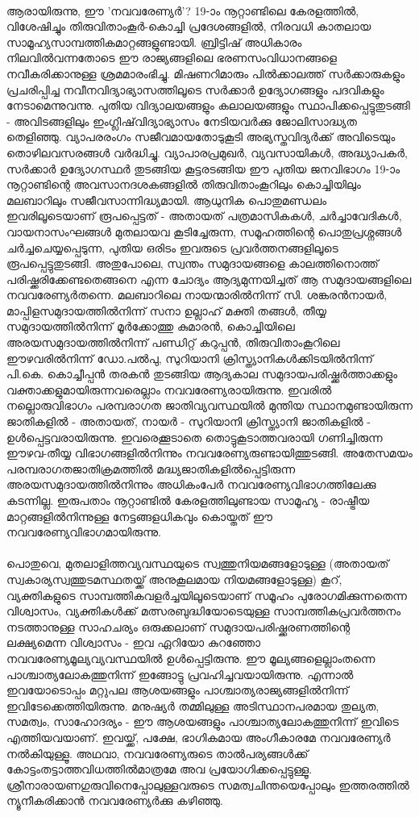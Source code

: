 \paragraph{}ആരായിരുന്നു, ഈ 'നവവരേണ്യർ'? 19-ാം നൂറ്റാണ്ടിലെ കേരളത്തിൽ, വിശേഷിച്ചും തിരുവിതാംകൂർ-കൊച്ചി പ്രദേശങ്ങളിൽ, നിരവധി കാതലായ സാമൂഹ്യസാമ്പത്തികമാറ്റങ്ങളുണ്ടായി. ബ്രിട്ടിഷ് അധികാരം നിലവിൽവന്നതോടെ ഈ രാജ്യങ്ങളിലെ ഭരണസംവിധാനങ്ങളെ നവീകരിക്കാനുള്ള ശ്രമമാരംഭിച്ചു. മിഷണറിമാരും പിൽക്കാലത്ത് സർക്കാരുകളും പ്രചരിപ്പിച്ച നവീനവിദ്യാഭ്യാസത്തിലൂടെ സർക്കാർ ഉദ്യോഗങ്ങളും പദവികളും നേടാമെന്നുവന്നു. പുതിയ വിദ്യാലയങ്ങളും കലാലയങ്ങളും സ്ഥാപിക്കപ്പെട്ടുതുടങ്ങി - അവിടങ്ങളിലും ഇംഗ്ലിഷ്‌വിദ്യാഭ്യാസം നേടിയവർക്കു ജോലിസാദ്ധ്യത തെളിഞ്ഞു. വ്യാപരരംഗം സജീവമായതോടുകൂടി അഭ്യസ്തവിദ്യർക്ക് അവിടെയും തൊഴിലവസരങ്ങൾ വർദ്ധിച്ചു. വ്യാപാരപ്രമുഖർ, വ്യവസായികൾ, അദ്ധ്യാപകർ, സർക്കാർ ഉദ്യോഗസ്ഥർ തുടങ്ങിയ കൂട്ടരടങ്ങിയ ഈ പുതിയ ജനവിഭാഗം 19-ാം നൂറ്റാണ്ടിന്റെ അവസാനദശകങ്ങളിൽ തിരുവിതാംകൂറിലും കൊച്ചിയിലും മലബാറിലും സജീവസാന്നിദ്ധ്യമായി. ആധുനിക പൊതുമണ്ഡലം ഇവരിലൂടെയാണ് രൂപപ്പെട്ടത് - അതായത് പത്രമാസികകൾ, ചർച്ചാവേദികൾ, വായനാസംഘങ്ങൾ മുതലായവ കൂടിച്ചേരുന്ന, സമൂഹത്തിന്റെ പൊതുപ്രശ്നങ്ങൾ ചർച്ചചെയ്യപ്പെടുന്ന, പുതിയ ഒരിടം ഇവരുടെ പ്രവർത്തനങ്ങളിലൂടെ രൂപപ്പെട്ടുതുടങ്ങി. അതുപോലെ, സ്വന്തം സമുദായങ്ങളെ കാലത്തിനൊത്ത് പരിഷ്ക്കരിക്കേണ്ടതെങ്ങനെ എന്ന ചോദ്യം ആദ്യമുന്നയിച്ചത് ആ സമുദായങ്ങളിലെ നവവരേണ്യർതന്നെ. മലബാറിലെ നായന്മാരിൽനിന്ന് സി. ശങ്കരൻനായർ, മാപ്പിളസമുദായത്തിൽനിന്ന് സനാ ഉല്ലാഹ് മക്തി തങ്ങൾ, തീയ്യ സമുദായത്തിൽനിന്ന് മൂർക്കോത്തു കുമാരൻ, കൊച്ചിയിലെ അരയസമുദായത്തിൽനിന്ന് പണ്ഡിറ്റ് കറുപ്പൻ, തിരുവിതാംകൂറിലെ ഈഴവരിൽനിന്ന് ഡോ.പൽപു, സുറിയാനി ക്രിസ്ത്യാനികൾക്കിടയിൽനിന്ന് പി.കെ. കൊച്ചീപ്പൻ തരകൻ തുടങ്ങിയ ആദ്യകാല സമുദായപരിഷ്ക്കർത്താക്കളും വക്താക്കളുമായിരുന്നവരെല്ലാം നവവരേണ്യരായിരുന്നു. ഇവരിൽ നല്ലൊരുവിഭാഗം പരമ്പരാഗത ജാതിവ്യവസ്ഥയിൽ മുന്തിയ സ്ഥാനമുണ്ടായിരുന്ന ജാതികളിൽ - അതായത്, നായർ - സുറിയാനി ക്രിസ്ത്യാനി ജാതികളിൽ - ഉൾപ്പെട്ടവരായിരുന്നു. ഇവരെക്കൂടാതെ തൊട്ടുകൂടാത്തവരായി ഗണിച്ചിരുന്ന ഈഴവ-തീയ്യ വിഭാഗങ്ങളിൽനിന്നും നവവരേണ്യരുണ്ടായിത്തുടങ്ങി. അതേസമയം പരമ്പരാഗതജാതിക്രമത്തിൽ മദ്ധ്യജാതികളിൽപ്പെട്ടിരുന്ന അരയസമുദായത്തിൽനിന്നും അധികംപേർ നവവരേണ്യവിഭാഗത്തിലേക്കു കടന്നില്ല. ഇരുപതാം നൂറ്റാണ്ടിൽ കേരളത്തിലുണ്ടായ സാമൂഹ്യ - രാഷ്ട്രീയ മാറ്റങ്ങളിൽനിന്നുള്ള നേട്ടങ്ങളധികവും കൊയ്തത് ഈ നവവരേണ്യവിഭാഗമായിരുന്നു.

\paragraph{}പൊതുവെ, മുതലാളിത്തവ്യവസ്ഥയുടെ സ്വത്തുനിയമങ്ങളോടുള്ള (അതായത് സ്വകാര്യസ്വത്തുടമസ്ഥതയ്ക്ക് അനുകൂലമായ നിയമങ്ങളോടുള്ള) കൂറ്, വ്യക്തികളുടെ സാമ്പത്തികവളർച്ചയിലൂടെയാണ് സമൂഹം പുരോഗമിക്കുന്നതെന്ന വിശ്വാസം, വ്യക്തികൾക്ക് മത്സരബുദ്ധിയോടെയുള്ള സാമ്പത്തികപ്രവർത്തനം നടത്താനുള്ള സാഹചര്യം ഒരുക്കലാണ് സമുദായപരിഷ്ക്കരണത്തിന്റെ ലക്ഷ്യമെന്ന വിശ്വാസം - ഇവ ഏറിയോ കുറഞ്ഞോ നവവരേണ്യമൂല്യവ്യവസ്ഥയിൽ ഉൾപ്പെട്ടിരുന്നു. ഈ മൂല്യങ്ങളെല്ലാംതന്നെ പാശ്ചാത്യലോകത്തുനിന്ന് ഇങ്ങോട്ടു പ്രവഹിച്ചവയായിരുന്നു. എന്നാൽ ഇവയോടൊപ്പം മറ്റുപല ആശയങ്ങളും പാശ്ചാത്യരാജ്യങ്ങളിൽനിന്ന് ഇവിടേക്കെത്തിയിരുന്നു. മനുഷ്യർ തമ്മിലുള്ള അടിസ്ഥാനപരമായ തുല്യത, സമത്വം, സാഹോദര്യം - ഈ ആശയങ്ങളും പാശ്ചാത്യലോകത്തുനിന്ന് ഇവിടെ എത്തിയവയാണ്. ഇവയ്ക്ക്, പക്ഷേ, ഭാഗികമായ അംഗീകാരമേ നവവരേണ്യർ നൽകിയുള്ളൂ. അഥവാ, നവവരേണ്യരുടെ താൽപര്യങ്ങൾക്ക് കോട്ടംതട്ടാത്തവിധത്തിൽമാത്രമേ അവ പ്രയോഗിക്കപ്പെട്ടുള്ളൂ. ശ്രീനാരായണഗുരുവിനെപ്പോലുള്ളവരുടെ സമത്വചിന്തയെപ്പോലും ഇത്തരത്തിൽ ന്യൂനീകരിക്കാൻ നവവരേണ്യർക്കു കഴിഞ്ഞു.


